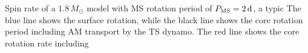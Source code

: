  \label{fig:MRI1.8rot} Spin rate of a $1.8 \, M_\odot$ model with MS rotation period of $P_{\rm MS} = 2 \, {\rm d}$, a typic The blue line shows the surface rotation, while the black line shows the core rotation period including AM transport by the TS dynamo. The red line shows the core rotation rate including